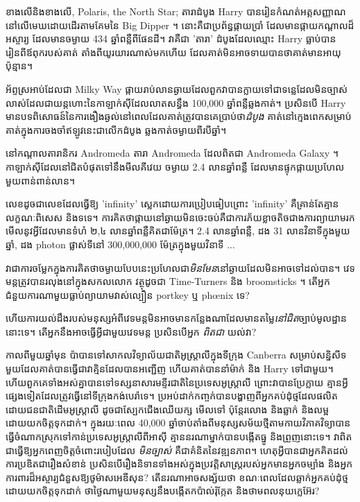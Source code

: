 ខាង​លើ​និង​ខាង​លើ, Polaris, the North Star; តារាដំបូង Harry បានរៀនកំណត់អត្តសញ្ញាណនៅលើមេឃដោយដើរតាមគែមនៃ Big Dipper ។ នោះគឺជាប្រព័ន្ធផ្កាយប្រាំ ដែលមានផ្កាយកណ្តាលដ៏អស្ចារ្យ ដែលមានចម្ងាយ 434 ឆ្នាំពន្លឺពីផែនដី។ វាគឺជា 'តារា' ដំបូងដែលឈ្មោះ Harry ធ្លាប់បានរៀនពីឪពុករបស់គាត់ តាំងពីយូរយារណាស់មកហើយ ដែលគាត់មិនអាចទាយបានថាគាត់មានអាយុប៉ុន្មាន។

អ័ព្ទស្រអាប់ដែលជា Milky Way ផ្កាយរាប់លានឆ្ងាយដែលពួកវាបានក្លាយទៅជាទន្លេដែលមិនច្បាស់លាស់ដែលជាយន្តហោះនៃកាឡាក់ស៊ីដែលលាតសន្ធឹង 100,000 ឆ្នាំពន្លឺឆ្លងកាត់។ ប្រសិនបើ Harry មានបទពិសោធន៍នៃការងឿងឆ្ងល់នៅពេលដែលគាត់ត្រូវបានគេប្រាប់ថា\emph{ដំបូង} គាត់នៅក្មេងពេកសម្រាប់គាត់ក្នុងការចងចាំឥឡូវនេះជាលើកដំបូង ឆ្លងកាត់ចម្ងាយពីរបីឆ្នាំ។

នៅកណ្តាលតារានិករ Andromeda តារា Andromeda ដែលពិតជា Andromeda Galaxy ។ កាឡាក់ស៊ីដែលនៅជិតបំផុតទៅនឹងមីលគីវេយ ចម្ងាយ 2.4 លានឆ្នាំពន្លឺ ដែលមានផ្ទុកផ្កាយប្រហែលមួយពាន់ពាន់លាន។

លេខ​ដូច​ជា​លេខ​ដែល​ធ្វើ​ឱ្យ 'infinity' ស្លេក​ដោយ​ការ​ប្រៀប​ធៀប​ព្រោះ 'infinity' គឺ​គ្រាន់​តែ​គ្មាន​លក្ខណៈ​ពិសេស និង​ទទេ។ ការ​គិត​ថា​ផ្កាយ​នៅ​ឆ្ងាយ​មិន​ចេះ​ចប់​គឺ​ជា​ការ​ភ័យ​ខ្លាច​តិច​ជាង​ការ​ព្យាយាម​រក​មើល​នូវ​អ្វី​ដែល​មាន​ទំហំ ២,៤ លាន​ឆ្នាំ​ពន្លឺ​គិត​ជា​ម៉ែត្រ។ 2.4 លានឆ្នាំពន្លឺ, ដង 31 លានវិនាទីក្នុងមួយឆ្នាំ, ដង photon ផ្លាស់ទីនៅ 300,000,000 ម៉ែត្រក្នុងមួយវិនាទី ...

វាជាការចម្លែកក្នុងការគិតថាចម្ងាយបែបនេះប្រហែលជា\emph{មិនមែន}នៅឆ្ងាយដែលមិនអាចទៅដល់បាន។ វេទមន្តត្រូវបានរលុងនៅក្នុងសកលលោក វត្ថុដូចជា Time-Turners និង broomsticks ។ តើអ្នកជំនួយការណាមួយធ្លាប់ព្យាយាមវាស់ល្បឿន portkey ឬ phœnix ទេ?

ហើយការយល់ដឹងរបស់មនុស្សអំពីវេទមន្តមិនអាចមានកន្លែងណាដែលមានតម្លៃ\emph{នៅជិត}ច្បាប់មូលដ្ឋាននោះទេ។ តើអ្នកនឹងអាចធ្វើអ្វីជាមួយវេទមន្ត ប្រសិនបើអ្នក \emph{ពិតជា} យល់វា?

កាល​ពី​មួយ​ឆ្នាំ​មុន ប៉ា​បាន​ទៅ​សាកល​វិទ្យាល័យ​ជាតិ​អូស្ត្រាលី​ក្នុង​ទីក្រុង Canberra សម្រាប់​សន្និសីទ​មួយ​ដែល​គាត់​បាន​ធ្វើ​ជា​វាគ្មិន​ដែល​បាន​អញ្ជើញ ហើយ​គាត់​បាន​នាំ​ម៉ាក់ និង Harry ទៅ​ជាមួយ។ ហើយពួកគេទាំងអស់គ្នាបានទៅទស្សនាសារមន្ទីរជាតិនៃប្រទេសអូស្ត្រាលី ព្រោះវាបានប្រែក្លាយ គ្មានអ្វីផ្សេងទៀតដែលត្រូវធ្វើនៅទីក្រុងកង់បេរ៉ាទេ។ ប្រអប់ដាក់កញ្ចក់បានបង្ហាញពីអ្នកគប់ដុំថ្មដែលផលិតដោយជនជាតិដើមអូស្ត្រាលី ដូចជាស្បែកជើងឈើយក្ស មើលទៅ ប៉ុន្តែរលោង និងឆ្លាក់ និងលម្អដោយយកចិត្តទុកដាក់។ ក្នុងរយៈពេល 40,000 ឆ្នាំចាប់តាំងពីមនុស្សសម័យថ្មីតាមកាយវិភាគវិទ្យាបានធ្វើចំណាកស្រុកទៅកាន់ប្រទេសអូស្ត្រាលីពីអាស៊ី គ្មាននរណាម្នាក់បានបង្កើតធ្នូ និងព្រួញនោះទេ។ វាពិតជាធ្វើឱ្យអ្នកពេញចិត្តចំពោះរបៀបដែល \emph{មិនច្បាស់} គឺជាគំនិតនៃវឌ្ឍនភាព។ ហេតុអ្វីបានជាអ្នកគិតដល់ការប្រឌិតជារឿងសំខាន់ ប្រសិនបើរឿងនិទានទាំងអស់ក្នុងប្រវត្តិសាស្ត្ររបស់អ្នកមានអ្នកចម្បាំង និងអ្នកការពារដ៏អស្ចារ្យជំនួសឱ្យថូម៉ាសអេឌីសុន? តើនរណាអាចសង្ស័យថា ខណៈពេលដែលឆ្លាក់អ្នកគប់ដុំថ្មដោយយកចិត្តទុកដាក់ ថាថ្ងៃណាមួយមនុស្សនឹងបង្កើតកប៉ាល់រ៉ុក្កែត និងថាមពលនុយក្លេអ៊ែរ?

